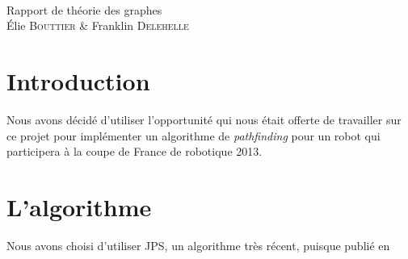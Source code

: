 \documentclass[a4paper,10pt]{article}
\begin{document}
\begin{center}
\thispagestyle{empty}
~\\
\vspace{5cm}
{\Huge \sffamily Rapport de théorie des graphes}\\
\vspace{5cm}
Élie \textsc{Bouttier} \& Franklin \textsc{Delehelle}\\
\end{center}
\newpage

\section{Introduction}
Nous avons décidé d'utiliser l'opportunité qui nous était offerte de travailler sur ce projet pour implémenter 
un algorithme de \emph{pathfinding} pour un robot qui participera à la coupe de France de robotique 2013.

\section{L'algorithme}
Nous avons choisi d'utiliser JPS, un algorithme très récent, puisque publié en
\end{document}
